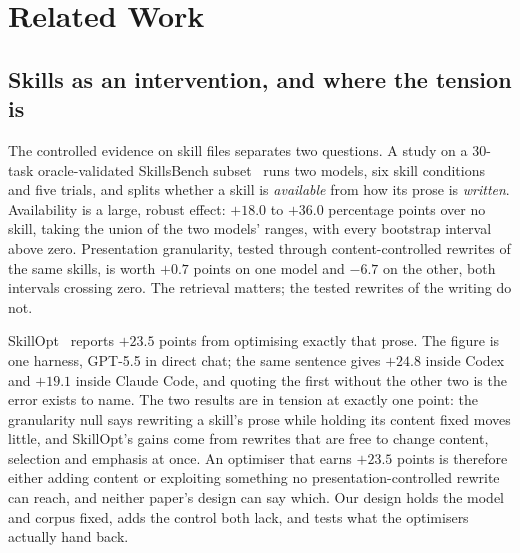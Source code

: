\section{Related Work}
\label{sec:related}


\subsection{Skills as an intervention, and where the tension is}

The controlled evidence on skill files separates two questions. A study on a
30-task oracle-validated SkillsBench subset~\citep{skillsbench2026} runs two
models, six skill conditions and five trials, and splits whether a skill is
\emph{available} from how its prose is \emph{written}. Availability is a
large, robust effect: $+18.0$ to $+36.0$ percentage points over no skill,
taking the union of the two models' ranges, with every bootstrap interval
above zero. Presentation granularity, tested through content-controlled
rewrites of the same skills, is worth $+0.7$ points on one model and $-6.7$
on the other, both intervals crossing zero. The retrieval matters; the
tested rewrites of the writing do not.

SkillOpt~\citep{skillopt2026} reports $+23.5$ points from optimising exactly
that prose. The figure is one harness, GPT-5.5 in direct chat; the same
sentence gives $+24.8$ inside Codex and $+19.1$ inside Claude Code, and
quoting the first without the other two is the error
\citet{harnessdisclosure2026} exists to name. The two results are in tension
at exactly one point: the granularity null
says rewriting a skill's prose while holding its content fixed moves little,
and SkillOpt's gains come from rewrites that are free to change content,
selection and emphasis at once. An optimiser that earns $+23.5$ points is
therefore either adding content or exploiting something no
presentation-controlled rewrite can reach, and neither paper's design can say
which. Our design holds the model and corpus fixed, adds the control both
lack, and tests what the optimisers actually hand back.

